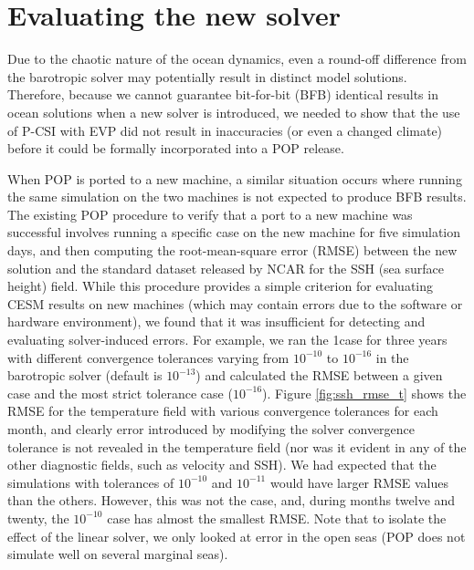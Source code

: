 \section{Evaluating the new solver} \label{se:ver}
Due to the chaotic nature of the ocean dynamics, even a round-off difference from the barotropic solver may potentially result in
distinct model solutions.
Therefore, because we cannot guarantee bit-for-bit (BFB) identical results in ocean solutions when a new solver is introduced,
we needed to show that the use of P-CSI with EVP did not result in inaccuracies (or even a changed climate)
before it could be formally incorporated into a POP release.

When POP is ported to a new machine, a similar situation occurs where running the same simulation on the two machines is not expected to produce BFB results.
The existing POP procedure to verify that a port to a new machine was successful involves running a specific case on the new machine for five simulation days, and
then computing the root-mean-square error (RMSE) between the new solution and the standard dataset released by NCAR for the SSH (sea surface height) field.
While this procedure provides a simple criterion for evaluating CESM results on new machines (which may contain errors due to the software or hardware environment),
we found that it was insufficient for detecting and evaluating solver-induced errors.
For example, we ran the 1\degree\space case for three years with different convergence tolerances varying from $10^{-10}$ to $10^{-16}$ in the barotropic solver (default is $10^{-13}$)
and calculated the RMSE between a given case and the most strict tolerance case ($10^{-16}$).
Figure \ref{fig:ssh_rmse_t} shows the RMSE for the temperature field with various convergence tolerances for each month, and clearly
error introduced by modifying the solver convergence tolerance is not revealed in the temperature field (nor was it evident in any of the other diagnostic fields, such as velocity and SSH).
We had expected that the simulations with tolerances of $10^{-10}$ and $10^{-11}$ would have larger RMSE values than the others.
However, this was not the case, and, during months twelve and twenty, the $10^{-10}$ case has almost the smallest RMSE.
Note that to isolate the effect of the linear solver, we only looked at error in the open seas (POP does not simulate well on several marginal seas).


